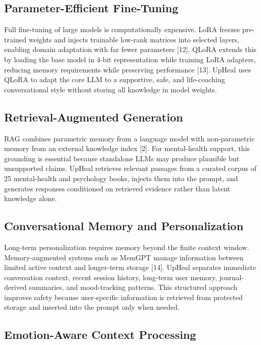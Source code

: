\documentclass[
  letterpaper,
  12pt,
  a4paper,
  openany]{report}
\begin{document}
\subsection{Parameter-Efficient
Fine-Tuning}\label{parameter-efficient-fine-tuning}

Full fine-tuning of large models is computationally expensive. LoRA
freezes pre-trained weights and injects trainable low-rank matrices into
selected layers, enabling domain adaptation with far fewer parameters
{[}12{]}. QLoRA extends this by loading the base model in 4-bit
representation while training LoRA adapters, reducing memory
requirements while preserving performance {[}13{]}. UpHeal uses QLoRA to
adapt the core LLM to a supportive, safe, and life-coaching
conversational style without storing all knowledge in model weights.

\subsection{Retrieval-Augmented
Generation}\label{retrieval-augmented-generation}

RAG combines parametric memory from a language model with non-parametric
memory from an external knowledge index {[}2{]}. For mental-health
support, this grounding is essential because standalone LLMs may produce
plausible but unsupported claims. UpHeal retrieves relevant passages
from a curated corpus of 25 mental-health and psychology books, injects
them into the prompt, and generates responses conditioned on retrieved
evidence rather than latent knowledge alone.

\subsection{Conversational Memory and
Personalization}\label{conversational-memory-and-personalization}

Long-term personalization requires memory beyond the finite context
window. Memory-augmented systems such as MemGPT manage information
between limited active context and longer-term storage {[}14{]}. UpHeal
separates immediate conversation context, recent session history,
long-term user memory, journal-derived summaries, and mood-tracking
patterns. This structured approach improves safety because user-specific
information is retrieved from protected storage and inserted into the
prompt only when needed.

\subsection{Emotion-Aware Context
Processing}\label{emotion-aware-context-processing}
\end{document}

